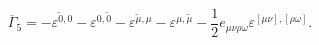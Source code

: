 \begin{equation}
\overline{\Gamma }_5=-\varepsilon ^{\widetilde{0},0}-\varepsilon
^{0,\widetilde{0}}-\varepsilon ^{\widetilde{\mu },\mu
}-\varepsilon ^{{\mu },\widetilde{\mu}}-\frac 12 e_{\mu \nu \rho
\omega }\varepsilon ^{[\mu \nu],[\rho \omega ]} . \label{56}
\end{equation}

